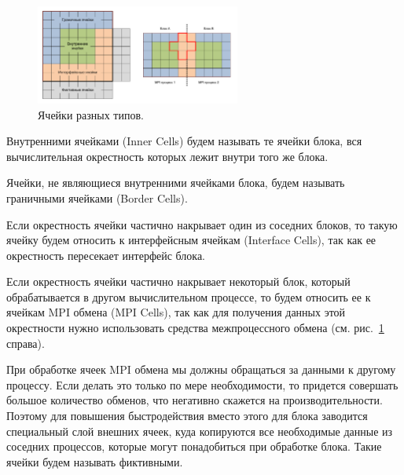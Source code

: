 \begin{figure}[ht]
\centering
\includegraphics[width=0.6\textwidth]{fig/par_4-block-cells.pdf}
\singlespacing
{}\caption{Ячейки разных типов.}
\label{fig:text_2_block_block_cells}
\end{figure}

\begin{definition}
Внутренними ячейками (Inner Cells) будем называть те ячейки блока, вся вычислительная окрестность которых лежит внутри того же блока.
\end{definition}

\begin{definition}
Ячейки, не являющиеся внутренними ячейками блока, будем называть граничными ячейками (Border Cells).
\end{definition}

\begin{definition}
Если окрестность ячейки частично накрывает один из соседних блоков, то такую ячейку будем относить к интерфейсным ячейкам (Interface Cells), так как ее окрестность пересекает интерфейс блока.
\end{definition}

\begin{definition}
Если окрестность ячейки частично накрывает некоторый блок, который обрабатывается в другом вычислительном процессе, то будем относить ее к ячейкам MPI\label{abbr:mpi-1} обмена (MPI Cells), так как для получения данных этой окрестности нужно использовать средства межпроцессного обмена (см. рис.~\ref{fig:text_2_block_block_cells} справа).
\end{definition}

При обработке ячеек MPI обмена мы должны обращаться за данными к другому процессу.
Если делать это только по мере необходимости, то придется совершать большое количество обменов, что негативно скажется на производительности.
Поэтому для повышения быстродействия вместо этого для блока заводится специальный слой внешних ячеек, куда копируются все необходимые данные из соседних процессов, которые могут понадобиться при обработке блока.
Такие ячейки будем называть фиктивными.

